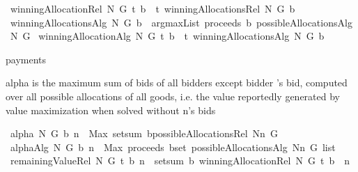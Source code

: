 \begin{isabellebody}
\ {\isachardoublequoteopen}winningAllocationRel\ N\ G\ t\ b\ {\isacharequal}{\isacharequal}\ t\ {\isacharparenleft}winningAllocationsRel\ N\ G\ b{\isacharparenright}{\isachardoublequoteclose}\isanewline
\isanewline
\isanewline
{}\isamarkupfalse%
\ {\isachardoublequoteopen}winningAllocationsAlg\ N\ G\ b\ {\isacharequal}{\isacharequal}\ argmaxList\ {\isacharparenleft}proceeds\ b{\isacharparenright}\ {\isacharparenleft}possibleAllocationsAlg\ N\ G{\isacharparenright}{\isachardoublequoteclose}\isanewline
\isanewline
\isanewline
{}\isamarkupfalse%
\ {\isachardoublequoteopen}winningAllocationAlg\ N\ G\ t\ b\ {\isacharequal}{\isacharequal}\ t\ {\isacharparenleft}winningAllocationsAlg\ N\ G\ b{\isacharparenright}{\isachardoublequoteclose}%
\begin{isamarkuptext}%
payments%
\end{isamarkuptext}%
\isamarkuptrue%
%
\begin{isamarkuptext}%
alpha is the maximum sum of bids of all bidders except bidder 's bid, computed over all possible allocations of all goods,
  i.e. the value reportedly generated by value maximization when solved without n's bids%
\end{isamarkuptext}%
\isamarkuptrue%
\isamarkupfalse%
\ {\isachardoublequoteopen}alpha\ N\ G\ b\ n\ {\isacharequal}{\isacharequal}\ Max\ {\isacharparenleft}{\isacharparenleft}setsum\ b{\isacharparenright}{\isacharbackquote}{\isacharparenleft}possibleAllocationsRel\ {\isacharparenleft}N{\isacharminus}{\isacharbraceleft}n{\isacharbraceright}{\isacharparenright}\ G{\isacharparenright}{\isacharparenright}{\isachardoublequoteclose}\isanewline
\isanewline
\isanewline
{}\isamarkupfalse%
\ {\isachardoublequoteopen}alphaAlg\ N\ G\ b\ n\ {\isacharequal}{\isacharequal}\ Max\ {\isacharparenleft}{\isacharparenleft}proceeds\ b{\isacharparenright}{\isacharbackquote}{\isacharparenleft}set\ {\isacharparenleft}possibleAllocationsAlg\ {\isacharparenleft}N{\isacharminus}{\isacharbraceleft}n{\isacharbraceright}{\isacharparenright}\ {\isacharparenleft}G{\isacharcolon}{\isacharcolon}{\isacharunderscore}\ list{\isacharparenright}{\isacharparenright}{\isacharparenright}{\isacharparenright}{\isachardoublequoteclose}\isanewline
\isanewline
\isanewline
{}\isamarkupfalse%
\ {\isachardoublequoteopen}remainingValueRel\ N\ G\ t\ b\ n\ {\isacharequal}{\isacharequal}\ setsum\ b\ {\isacharparenleft}{\isacharparenleft}winningAllocationRel\ N\ G\ t\ b{\isacharparenright}\ {\isacharminus}{\isacharminus}\ n{\isacharparenright}{\isachardoublequoteclose}\isanewline

\end{isabellebody}
